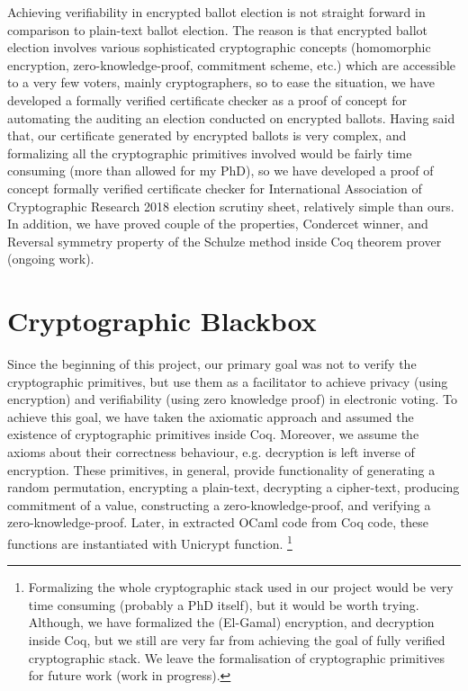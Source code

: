 Achieving verifiability in encrypted ballot election is not straight forward 
in comparison to plain-text ballot election. The reason is that 
encrypted ballot election involves various sophisticated 
cryptographic concepts (homomorphic encryption, zero-knowledge-proof, commitment scheme, etc.) 
which are accessible to a very few voters, mainly cryptographers, 
so to ease the situation, we have developed a formally verified 
certificate checker as a proof of concept for automating the auditing an election conducted on encrypted ballots. 
Having said that,  our certificate generated by encrypted ballots is very complex, and formalizing all the cryptographic 
primitives involved would be 
 fairly time consuming (more than allowed for my PhD), so we have developed a proof of concept 
formally verified certificate checker for International Association of Cryptographic Research 2018 election
scrutiny sheet, relatively simple than ours. 
In addition, we have proved couple of the properties, Condercet winner, and Reversal symmetry property 
of the Schulze method inside Coq theorem prover (ongoing work).
 

\section{Cryptographic Blackbox}
Since the beginning of this project, our primary goal was not to verify the cryptographic primitives, but use them as a 
facilitator to achieve privacy (using encryption) and verifiability (using zero knowledge proof) in electronic voting. 
To achieve this goal, we have 
taken the axiomatic approach and assumed the existence of cryptographic primitives 
inside Coq. Moreover, we assume the axioms about their correctness behaviour, e.g. 
decryption is left inverse of encryption. These primitives, in general, provide functionality 
of generating a random permutation, encrypting a plain-text, decrypting a cipher-text, 
producing commitment of a value, constructing a zero-knowledge-proof, 
and verifying a zero-knowledge-proof. Later, in extracted OCaml code from Coq code, these functions are instantiated 
with Unicrypt \citep{LocherH14} function. 
\footnote{Formalizing the whole cryptographic stack used in our 
project would be very time consuming (probably a PhD itself), but it would be worth trying. 
Although, we have formalized the (El-Gamal) encryption, and decryption inside Coq, but we still 
are very far from achieving the goal of fully verified cryptographic stack.  We leave the formalisation 
of cryptographic primitives for future work (work in progress).}



